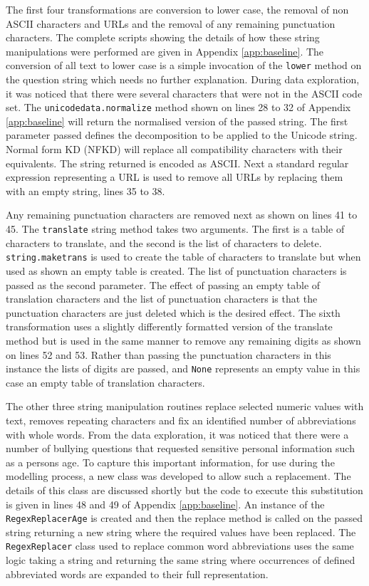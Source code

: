 The first four transformations are conversion to lower case, the removal of non ASCII characters and URLs and the removal of any remaining punctuation characters. The complete scripts showing the details of how these string manipulations were performed are given in Appendix \ref{app:baseline}. The conversion of all text to lower case is a simple invocation of the \verb|lower| method on the question string which needs no further explanation. During data exploration, it was noticed that there were several characters that were not in the ASCII code set. The \verb|unicodedata.normalize| method shown on lines 28 to 32 of Appendix \ref{app:baseline} will return the normalised version of the passed string. The first parameter passed defines the decomposition to be applied to the Unicode string. Normal form KD (NFKD) will replace all compatibility characters with their equivalents. The string returned is encoded as ASCII. Next a standard regular expression representing a URL is used to remove all URLs by replacing them with an empty string, lines 35 to 38. 

Any remaining punctuation characters are removed next as shown on lines 41 to 45. The \verb|translate| string method takes two arguments. The first is a table of characters to translate, and the second is the list of characters to delete. \verb|string.maketrans| is used to create the table of characters to translate but when used as shown an empty table is created. The list of punctuation characters is passed as the second parameter. The effect of passing an empty table of translation characters and the list of punctuation characters is that the punctuation characters are just deleted which is the desired effect. The sixth transformation uses a slightly differently formatted version of the translate method but is used in the same manner to remove any remaining digits as shown on lines 52 and 53. Rather than passing the punctuation characters in this instance the lists of digits are passed, and \verb|None| represents an empty value in this case an empty table of translation characters.

The other three string manipulation routines replace selected numeric values with text, removes repeating characters and fix an identified number of abbreviations with whole words. From the data exploration, it was noticed that there were a number of bullying questions that requested sensitive personal information such as a persons age. To capture this important information, for use during the modelling process, a new class was developed to allow such a replacement. The details of this class are discussed shortly but the code to execute this substitution is given in lines 48 and 49 of Appendix \ref{app:baseline}. An instance of the \verb|RegexReplacerAge| is created and then the replace method is called on the passed string returning a new string where the required values have been replaced. The \verb|RegexReplacer| class used to replace common word abbreviations uses the same logic taking a string and returning the same string where occurrences of defined abbreviated words are expanded to their full representation.

